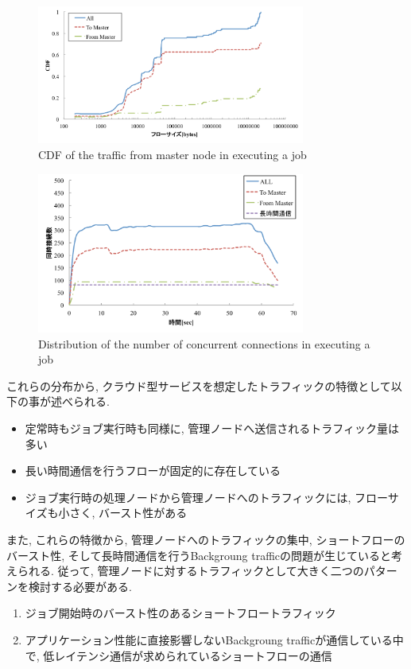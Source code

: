 \begin{figure}[t]
    \begin{center}
    \includegraphics[autoebb, width=250pt]{./img/job_cdf.pdf}
    \caption{CDF of the traffic from master node in executing a job}
    \label{fig:job_cdf}
    \end{center}
\end{figure}

\begin{figure}[t]
    \begin{center}
    \includegraphics[autoebb, width=250pt]{./img/job_conc.pdf}
    \caption{Distribution of the number of concurrent
    connections in executing a job}
    \label{fig:job_conc}
    \end{center}
\end{figure}

これらの分布から, クラウド型サービスを想定したトラフィックの特徴として以下の事が述べられる.
\begin{itemize}
  \item 定常時もジョブ実行時も同様に, 管理ノードへ送信されるトラフィック量は多い
  \item 長い時間通信を行うフローが固定的に存在している
  \item ジョブ実行時の処理ノードから管理ノードへのトラフィックには, フローサイズも小さく, バースト性がある
\end{itemize}

また, これらの特徴から, 管理ノードへのトラフィックの集中, ショートフローのバースト性,
そして長時間通信を行うBackgroung trafficの問題が生じていると考えられる.
従って, 管理ノードに対するトラフィックとして大きく二つのパターンを検討する必要がある.
\begin{enumerate}
  \item ジョブ開始時のバースト性のあるショートフロートラフィック
  \item アプリケーション性能に直接影響しないBackgroung trafficが通信している中で,
  低レイテンシ通信が求められているショートフローの通信
\end{enumerate}

